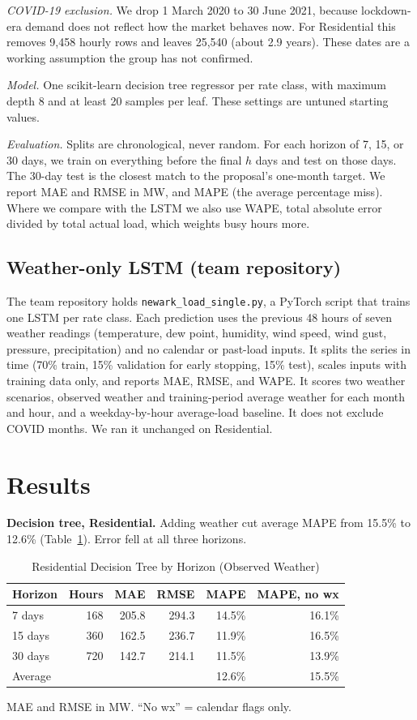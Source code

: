 \documentclass[10pt,letterpaper,twocolumn]{article}
\newcommand{\code}[1]{\texttt{#1}}
\begin{document}
\textit{COVID-19 exclusion.} We drop 1 March 2020 to 30 June 2021, because lockdown-era demand does not reflect how the market behaves now. For Residential this removes 9,458 hourly rows and leaves 25,540 (about 2.9 years). These dates are a working assumption the group has not confirmed.

\textit{Model.} One scikit-learn decision tree regressor \cite{sklearn} per rate class, with maximum depth 8 and at least 20 samples per leaf. These settings are untuned starting values.

\textit{Evaluation.} Splits are chronological, never random. For each horizon of 7, 15, or 30 days, we train on everything before the final $h$ days and test on those days. The 30-day test is the closest match to the proposal's one-month target. We report MAE and RMSE in MW, and MAPE (the average percentage miss). Where we compare with the LSTM we also use WAPE, total absolute error divided by total actual load, which weights busy hours more.

\subsection{Weather-only LSTM (team repository)}
The team repository holds \code{newark\_load\_single.py}, a PyTorch \cite{pytorch} script that trains one LSTM per rate class. Each prediction uses the previous 48 hours of seven weather readings (temperature, dew point, humidity, wind speed, wind gust, pressure, precipitation) and no calendar or past-load inputs. It splits the series in time (70\% train, 15\% validation for early stopping, 15\% test), scales inputs with training data only, and reports MAE, RMSE, and WAPE. It scores two weather scenarios, observed weather and training-period average weather for each month and hour, and a weekday-by-hour average-load baseline. It does not exclude COVID months. We ran it unchanged on Residential.

\section{Results}
\textbf{Decision tree, Residential.} Adding weather cut average MAPE from 15.5\% to 12.6\% (Table~\ref{tab:horizon}). Error fell at all three horizons.

\begin{table}[t]
\caption{Residential Decision Tree by Horizon (Observed Weather)}
\label{tab:horizon}
\centering\footnotesize
\setlength{\tabcolsep}{4pt}
\begin{tabular}{@{}lrrrrr@{}}
\toprule
Horizon & Hours & MAE & RMSE & MAPE & MAPE, no wx \\
\midrule
7 days & 168 & 205.8 & 294.3 & 14.5\% & 16.1\% \\
15 days & 360 & 162.5 & 236.7 & 11.9\% & 16.5\% \\
30 days & 720 & 142.7 & 214.1 & 11.5\% & 13.9\% \\
Average & & & & 12.6\% & 15.5\% \\
\bottomrule
\end{tabular}
\par\smallskip\noindent MAE and RMSE in MW. ``No wx'' = calendar flags only.
\end{table}
\end{document}
